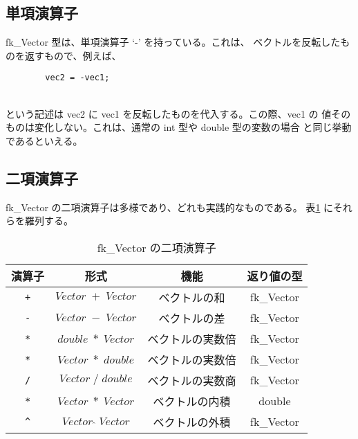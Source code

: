 \subsection{単項演算子}
fk\_Vector 型は、単項演算子 `-' を持っている。これは、
ベクトルを反転したものを返すもので、例えば、
\\
\begin{screen}
\begin{verbatim}
        vec2 = -vec1;
\end{verbatim}
\end{screen}
~ \\
という記述は vec2 に vec1 を反転したものを代入する。この際、vec1 の
値そのものは変化しない。これは、通常の int 型や double 型の変数の場合
と同じ挙動であるといえる。
\subsection{二項演算子}
fk\_Vector の二項演算子は多様であり、どれも実践的なものである。
表\ref{tbl:fkVec1}
にそれらを羅列する。
\begin{table}[H]
\caption{fk\_Vector の二項演算子}
\label{tbl:fkVec1}
\begin{center}
\begin{tabular}{|c|c|c|c|}
\hline
演算子 & 形式 & 機能 & 返り値の型 \\ \hline \hline
\verb-+- & \(Vector \; + \; Vector\) & ベクトルの和 & fk\_Vector \\ \hline
\verb+-+ & \(Vector \; - \; Vector\) & ベクトルの差 & fk\_Vector \\ \hline
\verb+*+ & \(double \; * \; Vector\) & ベクトルの実数倍 & fk\_Vector \\ \hline
\verb+*+ & \(Vector \; * \; double\) & ベクトルの実数倍 & fk\_Vector \\ \hline
\verb+/+ & \(Vector \; / \; double\) & ベクトルの実数商 & fk\_Vector \\ \hline
\verb+*+ & \(Vector \; * \; Vector\) & ベクトルの内積 & double \\ \hline
\verb+^+ & \(Vector \; \hat{} \; Vector\) & ベクトルの外積 &
							fk\_Vector \\ \hline
\end{tabular}
\end{center}
\end{table}

